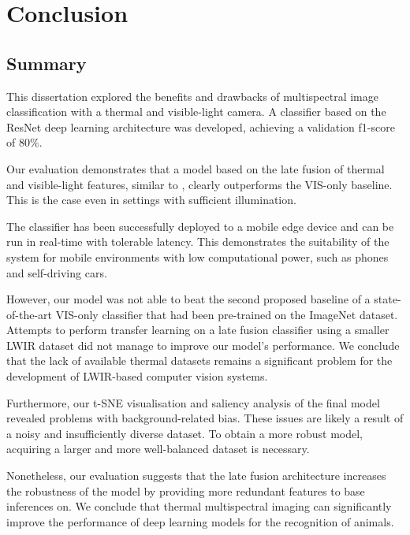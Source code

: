 \documentclass{l4proj}
\begin{document}
\chapter{Conclusion}

\section{Summary}

This dissertation explored the benefits and drawbacks of multispectral image classification with a thermal and visible-light camera. A classifier based on the ResNet deep learning architecture was developed, achieving a validation f1-score of $80\%$.

Our evaluation demonstrates that a model based on the late fusion of thermal and visible-light features, similar to \citet{wagner_multispectral_2016}, clearly outperforms the VIS-only baseline. This is the case even in settings with sufficient illumination.

The classifier has been successfully deployed to a mobile edge device and can be run in real-time with tolerable latency. This demonstrates the suitability of the system for mobile environments with low computational power, such as phones and self-driving cars.

However, our model was not able to beat the second proposed baseline of a state-of-the-art VIS-only classifier that had been pre-trained on the ImageNet dataset. Attempts to perform transfer learning on a late fusion classifier using a smaller LWIR dataset did not manage to improve our model's performance. We conclude that the lack of available thermal datasets remains a significant problem for the development of LWIR-based computer vision systems.

Furthermore, our t-SNE visualisation and saliency analysis of the final model revealed problems with background-related bias. These issues are likely a result of a noisy and insufficiently diverse dataset. To obtain a more robust model, acquiring a larger and more well-balanced dataset is necessary.

Nonetheless, our evaluation suggests that the late fusion architecture increases the robustness of the model by providing more redundant features to base inferences on. We conclude that thermal multispectral imaging can significantly improve the performance of deep learning models for the recognition of animals.
\end{document}
